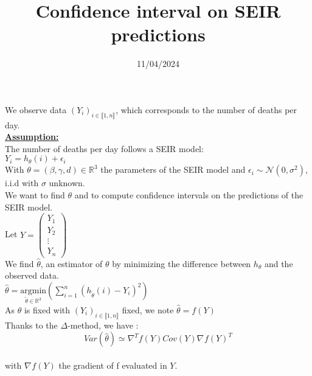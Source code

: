 \documentclass{article}
\title{Confidence interval on SEIR predictions}
\author{}
\date{11/04/2024}
\begin{document}
\maketitle


We observe data $(Y_i)_{i \in \llbracket 1, n  \rrbracket }$, which corresponds to the number of deaths per day. \\[0.5cm]

\underline{\textbf{Assumption:}}\\[0.5cm]
The number of deaths per day follows a SEIR model: \\
$Y_i = h_\theta(i) + \epsilon_i$\\

With $\theta = (\beta , \gamma , d ) \in \mathbb{R} ^3$ the parameters of the SEIR model and $\epsilon_i \sim \mathcal{N}(0, \sigma^2)$, i.i.d with $\sigma$ unknown.\\[0.5cm]

We want to find $\theta$ and to compute confidence intervals on the predictions of the SEIR model. \\[0.5cm]

Let $Y = 
\begin{pmatrix}
    Y_1 \\
    Y_2 \\
    \vdots \\
    Y_n
\end{pmatrix} $ \\[0.2cm]


We find $\hat{\theta}$, an estimator of $\theta$ by minimizing the difference between $h_\theta$ and the observed data.\\

$\hat{\theta}= \underset{\tilde{\theta} \in \mathbb{R} ^3}{\text{argmin}} \left(\sum_{i=1}^{n} (h_{\tilde{\theta}}(i) - Y_i)^2\right) $\\
As $\theta$ is fixed with $(Y_i)_{i \in \llbracket 1 , n  \rrbracket}$ fixed, we note $\hat{\theta} = f(Y)$\\

Thanks to the $\Delta$-method, we have : \\

\begin{equation} \label{eq:1}
    Var(\hat{\theta}) \simeq \nabla_{} ^T f(Y) Cov(Y) \nabla_{} f(Y)^T
\end{equation}\\[0.1cm]


with $\nabla_{}f(Y)$ the gradient of f evaluated in $Y$. \\
\end{document}
